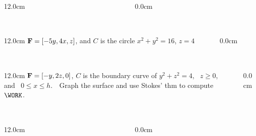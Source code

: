 \begin{frame}
\frametitle{}
\scriptsize
\begin{columns}
\begin{column}{12.0cm}
	
\end{column}
\begin{column}{0.0cm}\end{column}
\end{columns}
\end{frame}

\begin{frame}
\frametitle{}
\scriptsize
\begin{columns}
\begin{column}{12.0cm}
\EX ${\bf F} = [-5y,4x,z]$, and $C$ is the circle $x^2 + y^2 = 16$, $z=4$	

\vspace{9.2cm}

\end{column}
\begin{column}{0.0cm}\end{column}
\end{columns}
\end{frame}

\begin{frame}
\frametitle{}
\scriptsize
\begin{columns}
\begin{column}{12.0cm}
\EX ${\bf F} = [-y,2z,0]$, $C$ is the boundary curve of $y^2+z^2=4$, \, $z \ge 0$, \, and \, $0 \le x \le h$.  \,\, Graph the surface and use Stokes' thm to compute \,\, $\WORK$.

\vspace{8.2cm}

\end{column}
\begin{column}{0.0cm}\end{column}
\end{columns}
\end{frame}

\begin{frame}
\frametitle{}
\scriptsize
\begin{columns}
\begin{column}{12.0cm}
	
\end{column}
\begin{column}{0.0cm}\end{column}
\end{columns}
\end{frame}
